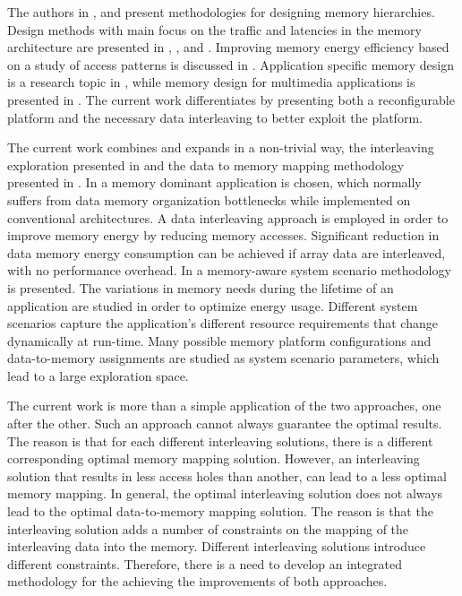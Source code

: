 \documentclass[prodmode,acmtecs]{acmsmall}
\begin{document}
The authors in \cite{abraham1999automatic}, \cite{jacob1996analytical} and \cite{li1999hardware} present methodologies for designing memory hierarchies.
Design methods with main focus on the traffic and latencies in the memory architecture are presented in \cite{chen1999loop}, \cite{grun2000mist}, \cite{jantsch1994hardware} and \cite{passes1995multi}.
Improving memory energy efficiency based on a study of access patterns is discussed in \cite{kandemir2001improving}.
Application specific memory design is a research topic in \cite{schmit1997synthesis}, while memory design for multimedia applications is presented in \cite{oshima1997high}.
The current work differentiates by presenting both a reconfigurable platform and the necessary data interleaving to better exploit the platform.

The current work combines and expands in a non-trivial way, the interleaving exploration presented in \cite{sharma2013data} and the data to memory mapping methodology presented in \cite{filippopoulos2013exploration}. 
In \cite{sharma2013data} a memory dominant application is chosen, which normally suffers from data memory organization bottlenecks while implemented on conventional architectures. 
A data interleaving approach is employed in order to improve memory energy by reducing memory accesses.
Significant reduction in data memory energy consumption can be achieved if array data are interleaved, with no performance overhead.
In \cite{filippopoulos2013exploration} a memory-aware system scenario methodology is presented.
The variations in memory needs during the lifetime of an application are studied in order to optimize energy usage.
Different system scenarios capture the application's different resource requirements that change dynamically at run-time.
Many possible memory platform configurations and data-to-memory assignments are studied as system scenario parameters, which lead to a large exploration space.

The current work is more than a simple application of the two approaches, one after the other.
Such an approach cannot always guarantee the optimal results.
The reason is that for each different interleaving solutions, there is a different corresponding optimal memory mapping solution.
However, an interleaving solution that results in less access holes than another, can lead to a less optimal memory mapping.
In general, the optimal interleaving solution does not always lead to the optimal data-to-memory mapping solution.
The reason is that the interleaving solution adds a number of constraints on the mapping of the interleaving data into the memory. 
Different interleaving solutions introduce different constraints. 
Therefore, there is a need to develop an integrated methodology for the achieving the improvements of both approaches.
\end{document}
